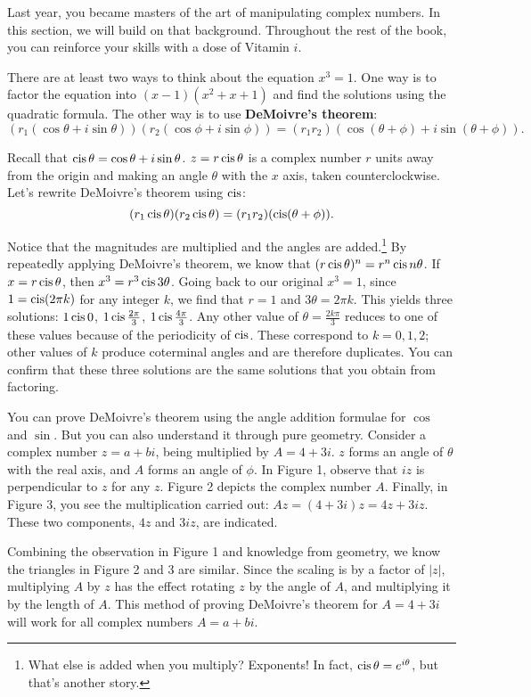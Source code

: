 \documentclass[../gatm.tex]{subfiles}
\begin{document}
\noindent Last year, you became masters of the art of manipulating complex numbers. In this section, we will build on that background. Throughout the rest of the book, you can reinforce your skills with a dose of Vitamin $i$.

There are at least two ways to think about the equation $x^3 = 1$. One way is to factor the equation into $(x-1)(x^2+x+1)$ and find the solutions using the quadratic formula. The other way is to use \textbf{DeMoivre’s theorem}:
\[(r_1 (\cos \theta + i \sin \theta)) (r_2 (\cos \phi + i \sin \phi)) = (r_1r_2) (\cos(\theta + \phi) + i \sin(\theta + \phi)).\]

Recall that $\operatorname{cis} \theta = \cos \theta + i \sin \theta$. $z=r\operatorname{cis} \theta$ is a complex number $r$ units away from the origin and making an angle $\theta$ with the $x$ axis, taken counterclockwise. Let’s rewrite DeMoivre’s theorem using $\operatorname{cis}$:
\[(r_1 \operatorname{cis} \theta)(r_2 \operatorname{cis} \theta) = (r_1r_2)(\operatorname{cis}(\theta + \phi)).\]

\noindent Notice that the magnitudes are multiplied and the angles are added.\footnote{What else is added when you multiply? Exponents! In fact, $\operatorname{cis} \theta = e^{i\theta}$, but that’s another story.} By repeatedly applying DeMoivre's theorem, we know that $(r \operatorname{cis} \theta) ^ n = r^n \operatorname{cis} n\theta$. If $x = r \operatorname{cis} \theta$, then $x^3 = r^3 \operatorname{cis} 3\theta$. Going back to our original $x^3 = 1$, since $1 = \operatorname{cis}(2\pi k)$ for any integer $k$, we find that $r = 1$ and $3\theta = 2\pi k$. This yields three solutions: $1 \operatorname{cis} 0$, $1 \operatorname{cis} \frac{2\pi}{3}$, $1 \operatorname{cis} \frac{4\pi}{3}$. Any other value of $\theta=\frac{2k\pi}{3}$ reduces to one of these values because of the periodicity of $\operatorname{cis}$. These correspond to $k = 0, 1, 2$; other values of $k$ produce coterminal angles and are therefore duplicates. You can confirm that these three solutions are the same solutions that you obtain from factoring.

You can prove DeMoivre’s theorem using the angle addition formulae for $\cos$ and $\sin$. But you can also understand it through pure geometry. Consider a complex number $z = a + bi$, being multiplied by $A = 4 + 3i$. $z$ forms an angle of $\theta$ with the real axis, and $A$ forms an angle of $\phi$. In Figure 1, observe that $iz$ is perpendicular to $z$ for any $z$. Figure 2 depicts the complex number $A$. Finally, in Figure 3, you see the multiplication carried out: $Az = (4+3i)z = 4z + 3iz$. These two components, $4z$ and $3iz$, are indicated.

Combining the observation in Figure 1 and knowledge from geometry, we know the triangles in Figure 2 and 3 are similar. Since the scaling is by a factor of $|z|$, multiplying $A$ by $z$ has the effect rotating $z$ by the angle of $A$, and multiplying it by the length of $A$. This method of proving DeMoivre's theorem for $A=4+3i$ will work for all complex numbers $A=a+bi$.
\end{document}
